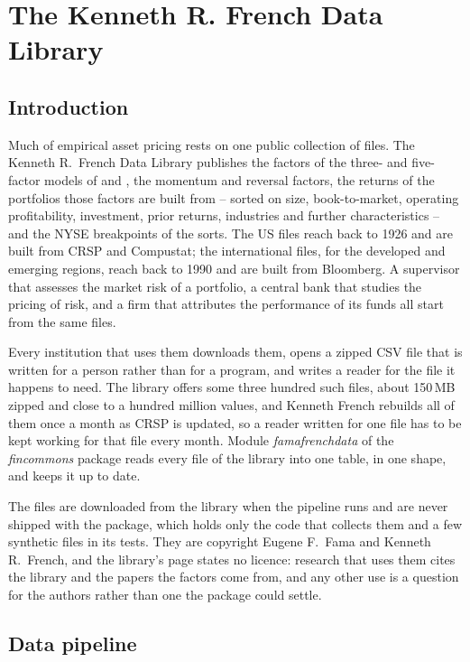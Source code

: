 \chapter{The Kenneth R. French Data Library}\label{ch:famafrenchdata}

\section{Introduction}

Much of empirical asset pricing rests on one public collection of files. The Kenneth R.\ French Data Library \parencite{French.2026} publishes the factors of the three- and five-factor models of \textcite{Fama.1993} and \textcite{Fama.2015}, the momentum and reversal factors, the returns of the portfolios those factors are built from -- sorted on size, book-to-market, operating profitability, investment, prior returns, industries and further characteristics -- and the NYSE breakpoints of the sorts. The US files reach back to 1926 and are built from CRSP and Compustat; the international files, for the developed and emerging regions, reach back to 1990 and are built from Bloomberg. A supervisor that assesses the market risk of a portfolio, a central bank that studies the pricing of risk, and a firm that attributes the performance of its funds all start from the same files.

Every institution that uses them downloads them, opens a zipped CSV file that is written for a person rather than for a program, and writes a reader for the file it happens to need. The library offers some three hundred such files, about 150\,MB zipped and close to a hundred million values, and Kenneth French rebuilds all of them once a month as CRSP is updated, so a reader written for one file has to be kept working for that file every month. Module \emph{famafrenchdata} of the \emph{fincommons} package reads every file of the library into one table, in one shape, and keeps it up to date.

The files are downloaded from the library when the pipeline runs and are never shipped with the package, which holds only the code that collects them and a few synthetic files in its tests. They are copyright Eugene F.\ Fama and Kenneth R.\ French, and the library's page states no licence: research that uses them cites the library and the papers the factors come from, and any other use is a question for the authors rather than one the package could settle.

\section{Data pipeline}

